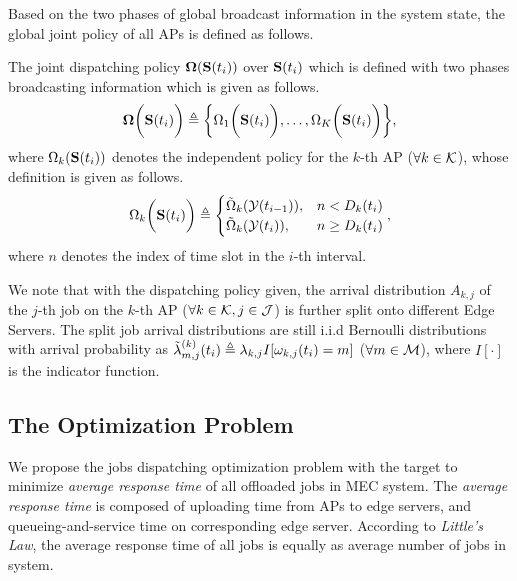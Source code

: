 Based on the two phases of global broadcast information in the system state, the global joint policy of all APs is defined as follows.
\begin{definition}
    The joint dispatching policy $\boldsymbol{\Omega}(\mathbf{S}(t_{i}))$ over $\mathbf{S}(t_{i})$ which is defined with two phases broadcasting information which is given as follows.
    \begin{align}
        \boldsymbol{\Omega}\bigg(\mathbf{S}(t_{i})\bigg) \triangleq \bigg\{
            \Omega_{1}\bigg(\mathbf{S}(t_{i})\bigg), \dots, \Omega_{K}\bigg(\mathbf{S}(t_{i})\bigg)
        \bigg\},
    \end{align}
    where
    $\Omega_{k}(\mathbf{S}(t_{i}))$ denotes the independent policy for the $k$-th AP ($\forall k\in\mathcal{K}$), whose definition is given as follows.
    \begin{align}
        \Omega_{k}\bigg(\mathbf{S}(t_{i})\bigg) \triangleq
        \begin{cases}
            \tilde{\Omega}_{k}( \mathcal{Y}(t_{i-1}) ), &n < D_{k}(t_{i})
            \\
            \tilde{\Omega}_{k}( \mathcal{Y}(t_{i}) ), &n \geq D_{k}(t_{i})
        \end{cases},
    \end{align}
    where $n$ denotes the index of time slot in the $i$-th interval.
\end{definition}

We note that with the dispatching policy given, the arrival distribution $A_{k,j}$ of the $j$-th job on the $k$-th AP ($\forall k\in\mathcal{K}, j\in\mathcal{J}$) is further split onto different Edge Servers.
The split job arrival distributions are still i.i.d Bernoulli distributions with arrival probability as 
$\tilde{\lambda}^{(k)}_{m,j}(t_{i}) \triangleq \lambda_{k,j} I[\omega_{k,j}(t_i) = m]$ ($\forall m\in\mathcal{M}$), where $I[\cdot]$ is the indicator function.

\subsection{The Optimization Problem}
We propose the jobs dispatching optimization problem with the target to minimize \emph{average response time} of all offloaded jobs in MEC system.
The \emph{average response time} is composed of uploading time from APs to edge servers, and queueing-and-service time on corresponding edge server. According to \emph{Little's Law}, the average response time of all jobs is equally as average number of jobs in system.
        
